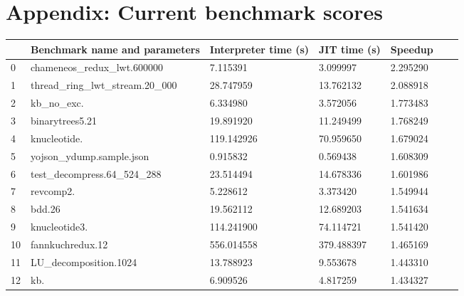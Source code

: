 \documentclass[12pt,a4paper, headings=standardclasses, parskip=on]{scrartcl}
\begin{document}
\section{Appendix: Current benchmark scores} \label{benchmarks}


\begin{longtable}{@{}lllllll@{}}
\toprule
   & Benchmark name and parameters                      & Interpreter time (s) & JIT time (s) & Speedup \\ \midrule
\endhead
0  & chameneos\_redux\_lwt.600000                       & 7.115391             & 3.099997     & 2.295290                      \\
1  & thread\_ring\_lwt\_stream.20\_000                  & 28.747959            & 13.762132    & 2.088918                      \\
2  & kb\_no\_exc.                                       & 6.334980             & 3.572056     & 1.773483                      \\
3  & binarytrees5.21                                    & 19.891920            & 11.249499    & 1.768249                      \\
4  & knucleotide.                                       & 119.142926           & 70.959650    & 1.679024                      \\
5  & yojson\_ydump.sample.json                          & 0.915832             & 0.569438     & 1.608309                      \\
6  & test\_decompress.64\_524\_288                      & 23.514494            & 14.678336    & 1.601986                      \\
7  & revcomp2.                                          & 5.228612             & 3.373420     & 1.549944                      \\
8  & bdd.26                                             & 19.562112            & 12.689203    & 1.541634                      \\
9  & knucleotide3.                                      & 114.241900           & 74.114721    & 1.541420                      \\
10 & fannkuchredux.12                                   & 556.014558           & 379.488397   & 1.465169                      \\
11 & LU\_decomposition.1024                             & 13.788923            & 9.553678     & 1.443310                      \\
12 & kb.                                                & 6.909526             & 4.817259     & 1.434327                      \\

\end{longtable}
\end{document}
